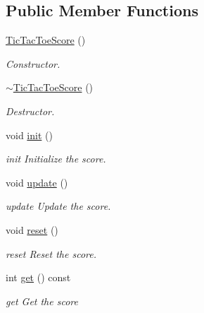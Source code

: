 \subsection*{Public Member Functions}
\begin{DoxyCompactItemize}
\item 
\mbox{\label{class_tic_tac_toe_score_a722bc40d54bbfd0e7835b478d8f0a38d}} 
\hyperlink{class_tic_tac_toe_score_a722bc40d54bbfd0e7835b478d8f0a38d}{Tic\+Tac\+Toe\+Score} ()
\begin{DoxyCompactList}\small\item\em Constructor. \end{DoxyCompactList}\item 
\mbox{\label{class_tic_tac_toe_score_aa5efe0e9673d7e8d89dc51c4174f87ee}} 
\hyperlink{class_tic_tac_toe_score_aa5efe0e9673d7e8d89dc51c4174f87ee}{$\sim$\+Tic\+Tac\+Toe\+Score} ()
\begin{DoxyCompactList}\small\item\em Destructor. \end{DoxyCompactList}\item 
\mbox{\label{class_tic_tac_toe_score_a463b691c79c6f566f98ab415cfa6bad4}} 
void \hyperlink{class_tic_tac_toe_score_a463b691c79c6f566f98ab415cfa6bad4}{init} ()
\begin{DoxyCompactList}\small\item\em init Initialize the score. \end{DoxyCompactList}\item 
\mbox{\label{class_tic_tac_toe_score_a4475a34d15caf4b0bd31297583f5395a}} 
void \hyperlink{class_tic_tac_toe_score_a4475a34d15caf4b0bd31297583f5395a}{update} ()
\begin{DoxyCompactList}\small\item\em update Update the score. \end{DoxyCompactList}\item 
\mbox{\label{class_tic_tac_toe_score_a864d721af50b619dcedbf11f3b9d749e}} 
void \hyperlink{class_tic_tac_toe_score_a864d721af50b619dcedbf11f3b9d749e}{reset} ()
\begin{DoxyCompactList}\small\item\em reset Reset the score. \end{DoxyCompactList}\item 
int \hyperlink{class_tic_tac_toe_score_a6fd4f04069d34b7bb9a2ca11d8a644cc}{get} () const
\begin{DoxyCompactList}\small\item\em get Get the score \end{DoxyCompactList}\end{DoxyCompactItemize}


